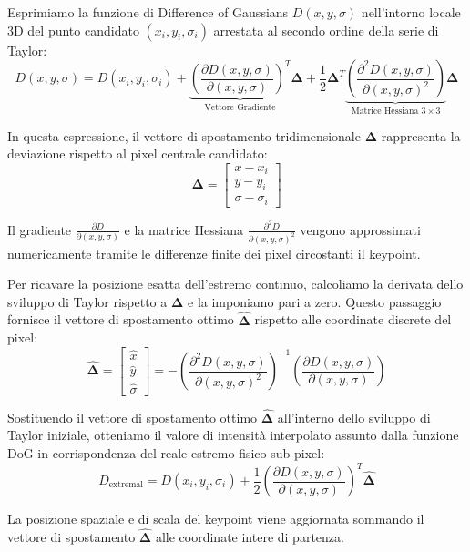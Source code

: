 ﻿\documentclass[11pt, a4paper]{article}
\begin{document}
Esprimiamo la funzione di Difference of Gaussians $D(x, y, \sigma)$ nell'intorno locale 3D del punto candidato $(x_i, y_i, \sigma_i)$ arrestata al secondo ordine della serie di Taylor:
\[ D(x, y, \sigma) = D(x_i, y_i, \sigma_i) + \underbrace{\left( \frac{\partial D(x, y, \sigma)}{\partial (x, y, \sigma)} \right)^T}_{\text{Vettore Gradiente}} \bm{\Delta} + \frac{1}{2} \bm{\Delta}^T \underbrace{\left( \frac{\partial^2 D(x, y, \sigma)}{\partial (x, y, \sigma)^2} \right)}_{\text{Matrice Hessiana } 3 \times 3} \bm{\Delta} \]

In questa espressione, il vettore di spostamento tridimensionale $\bm{\Delta}$ rappresenta la deviazione rispetto al pixel centrale candidato:
\[ \bm{\Delta} = \begin{bmatrix} x - x_i \\ y - y_i \\ \sigma - \sigma_i \end{bmatrix} \]

Il gradiente $\frac{\partial D}{\partial (x,y,\sigma)}$ e la matrice Hessiana $\frac{\partial^2 D}{\partial (x,y,\sigma)^2}$ vengono approssimati numericamente tramite le differenze finite dei pixel circostanti il keypoint.

Per ricavare la posizione esatta dell'estremo continuo, calcoliamo la derivata dello sviluppo di Taylor rispetto a $\bm{\Delta}$ e la imponiamo pari a zero. Questo passaggio fornisce il vettore di spostamento ottimo $\bm{\hat{\Delta}}$ rispetto alle coordinate discrete del pixel:
\[ \bm{\hat{\Delta}} = \begin{bmatrix} \hat{x} \\ \hat{y} \\ \hat{\sigma} \end{bmatrix} = - \left( \frac{\partial^2 D(x, y, \sigma)}{\partial (x, y, \sigma)^2} \right)^{-1} \left( \frac{\partial D(x, y, \sigma)}{\partial (x, y, \sigma)} \right) \]

Sostituendo il vettore di spostamento ottimo $\bm{\hat{\Delta}}$ all'interno dello sviluppo di Taylor iniziale, otteniamo il valore di intensità interpolato assunto dalla funzione DoG in corrispondenza del reale estremo fisico sub-pixel:
\[ \boxed{D_{\text{extremal}} = D(x_i, y_i, \sigma_i) + \frac{1}{2} \left( \frac{\partial D(x, y, \sigma)}{\partial (x, y, \sigma)} \right)^T \bm{\hat{\Delta}}} \]

La posizione spaziale e di scala del keypoint viene aggiornata sommando il vettore di spostamento $\bm{\hat{\Delta}}$ alle coordinate intere di partenza.
\end{document}
